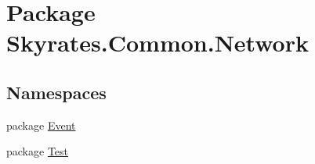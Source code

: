 \hypertarget{namespace_skyrates_1_1_common_1_1_network}{\section{Package Skyrates.\-Common.\-Network}
\label{namespace_skyrates_1_1_common_1_1_network}
}
\subsection*{Namespaces}
\begin{DoxyCompactItemize}
\item 
package \hyperlink{namespace_skyrates_1_1_common_1_1_network_1_1_event}{Event}
\item 
package \hyperlink{namespace_skyrates_1_1_common_1_1_network_1_1_test}{Test}
\end{DoxyCompactItemize}

